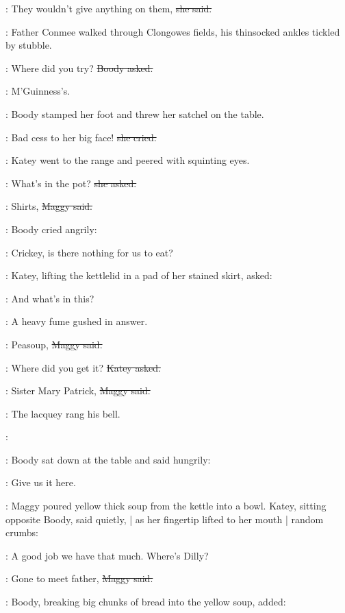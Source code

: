\maggy:
They wouldn't give anything on them,
\sout{she said.}

\begin{interject}
    :
    Father Conmee walked through Clongowes fields,
    his thinsocked ankles tickled by stubble.
\end{interject}

\boody:
Where did you try?
\sout{Boody asked.}

\maggy:
M'Guinness's.

:
Boody stamped her foot and threw her satchel on the table.

\boody:
Bad cess to her big face!
\sout{she cried.}

:
Katey went to the range%
and peered with squinting eyes.

\katey:
What's in the pot?
\sout{she asked.}

\maggy:
Shirts,
\sout{Maggy said.}

:
Boody cried angrily:

\boody:
Crickey, is there nothing for us to eat?

:
Katey,
lifting the kettlelid in a pad of her stained skirt,
asked:

\katey:
And what's in this?

:
A heavy fume gushed in answer.

\maggy:
Peasoup,
\sout{Maggy said.}

\katey:
Where did you get it?
\sout{Katey asked.}

\maggy:
Sister Mary Patrick,%
\sout{Maggy said.}

\begin{interject}
    :
    The lacquey rang his bell.

    \bell:
\end{interject}

:
Boody sat down at the table and said hungrily:

\boody:
Give us it here.

:
Maggy poured yellow thick soup from the kettle into a bowl.
Katey,
sitting opposite Boody,
said quietly, |
as her fingertip lifted to her mouth |
random crumbs:

\katey:
A good job we have that much.
Where's Dilly?

\maggy:
Gone to meet father,
\sout{Maggy said.}

:
Boody,
breaking big chunks of bread into the yellow soup,%
added:

